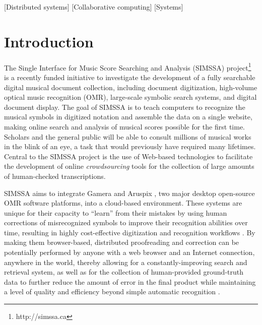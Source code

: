 \documentclass{sig-alternate}
\begin{document}
[Distributed systems]
[Collaborative computing]
[Systems]


\newpage
\section{Introduction}

The Single Interface for Music Score Searching and Analysis (SIMSSA) project\footnote{http://simssa.ca} is a recently funded initiative to investigate the development of a fully searchable digital musical document collection, including document digitization, high-volume optical music recognition (OMR), large-scale symbolic search systems, and digital document display. The goal of SIMSSA is to teach computers to recognize the musical symbols in digitized notation and assemble the data on a single website, making online search and analysis of musical scores possible for the first time. Scholars and the general public will be able to consult millions of musical works in the blink of an eye, a task that would previously have required many lifetimes. Central to the SIMSSA project is the use of Web-based technologies to facilitate the development of online \emph{crowdsourcing} tools for the collection of large amounts of human-checked transcriptions. 

SIMSSA aims to integrate Gamera \cite{droettboom2003} and Aruspix \cite{pugin2008}, two major desktop open-source OMR software platforms, into a cloud-based environment. These systems are unique for their capacity to ``learn'' from their mistakes by using human corrections of misrecognized symbols to improve their recognition abilities over time, resulting in highly cost-effective digitization and recognition workflows \cite{pugin2007}. By making them browser-based, distributed proofreading and correction can be potentially performed by anyone with a web browser and an Internet connection, anywhere in the world, thereby allowing for a constantly-improving search and retrieval system, as well as for the collection of human-provided ground-truth data to further reduce the amount of error in the final product while maintaining a level of quality and efficiency beyond simple automatic recognition \cite{hankinson2012}. 
\end{document}
